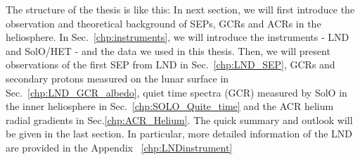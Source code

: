 The structure of the thesis is like this: In next section, we will first introduce the observation and theoretical background of \acp{SEP}, \acp{GCR} and \acp{ACR} in the heliosphere. In Sec.~\ref{chp:instruments}, we will introduce the instruments - \ac{LND} and \ac{SolO}/\ac{HET} - and the data we used in this thesis. Then, we will present observations of the first \ac{SEP} from \ac{LND} in Sec.~\ref{chp:LND_SEP}, \acp{GCR} and secondary protons measured on the lunar surface in Sec.~\ref{chp:LND_GCR_albedo}, quiet time spectra (\ac{GCR}) measured by \ac{SolO} in the inner heliosphere in Sec.~\ref{chp:SOLO_Quite_time} and the \ac{ACR} helium radial gradients in Sec.\ref{chp:ACR_Helium}. The quick summary and outlook will be given in the last section.
In particular, more detailed information of the \ac{LND} are provided in the Appendix ~\ref{chp:LNDinstrument}



